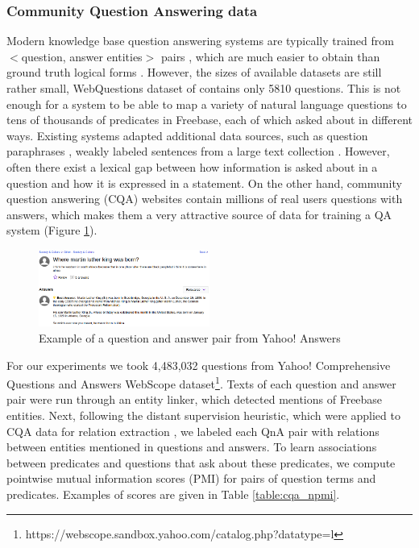 \subsubsection{Community Question Answering data}
\label{section:method:cqa}

Modern knowledge base question answering systems are typically trained from $<$question, answer entities$>$ pairs \cite{Berant:EMNLP13}, which are much easier to obtain than ground truth logical forms \cite{cai2013large}.
However, the sizes of available datasets are still rather small, \ie WebQuestions dataset of \cite{Berant:EMNLP13} contains only 5810 questions.
This is not enough for a system to be able to map a variety of natural language questions to tens of thousands of predicates in Freebase, each of which asked about in different ways.
Existing systems adapted additional data sources, such as question paraphrases \cite{berant2014semantic}, weakly labeled sentences from a large text collection \cite{yao2014information}.
However, often there exist a lexical gap between how information is asked about in a question and how it is expressed in a statement.
On the other hand, community question answering (CQA) websites contain millions of real users questions with answers, which makes them a very attractive source of data for training a QA system (\eg Figure \ref{fig:cqa_example}).

\begin{figure}
\centering
\includegraphics[width=0.5\textwidth]{img/cqa_example}
\caption{Example of a question and answer pair from Yahoo! Answers}
\label{fig:cqa_example}
\end{figure}

For our experiments we took 4,483,032 questions from Yahoo! Comprehensive Questions and Answers WebScope dataset\footnote{https://webscope.sandbox.yahoo.com/catalog.php?datatype=l}.
Texts of each question and answer pair were run through an entity linker, which detected mentions of Freebase entities.
Next, following the distant supervision heuristic, which were applied to CQA data for relation extraction \cite{savenkov-EtAl:2015:SRW}, we labeled each QnA pair with relations between entities mentioned in questions and answers.
To learn associations between predicates and questions that ask about these predicates, we compute pointwise mutual information scores (PMI) for pairs of question terms and predicates.
Examples of scores are given in Table \ref{table:cqa_npmi}.

